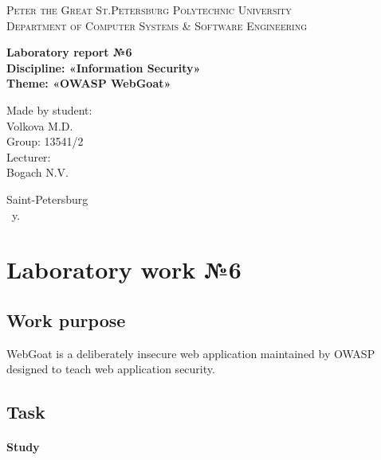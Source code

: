 \documentclass[14pt,a4paper,report]{report}
\begin{document}
\def\contentsname{Contents}

\begin{titlepage}
	\begin{center}
		\textsc{Peter the Great St.Petersburg Polytechnic University\\[5mm]
			Department of Computer Systems \& Software Engineering}
		
		\vfill
		
		\textbf{Laboratory report №6\\[3mm]
			Discipline: «Information Security»\\[3mm]
			Theme: «OWASP WebGoat»\\[41mm]
		}
	\end{center}
	
	\hfill
	\begin{minipage}{.4\textwidth}
		Made by student:\\[2mm] 
		Volkova M.D.\\
		Group: 13541/2\\[5mm]
		
		Lecturer:\\[2mm] 
		Bogach N.V.
	\end{minipage}
	\vfill
	\begin{center}
		Saint-Petersburg\\ \the\year\ y.
	\end{center}
\end{titlepage}

\tableofcontents
\clearpage

\chapter{Laboratory work №6}

\section{Work purpose}

WebGoat is a deliberately insecure web application maintained by OWASP designed to teach web application security.

\section{Task}

\subsubsection{Study}
\end{document}
